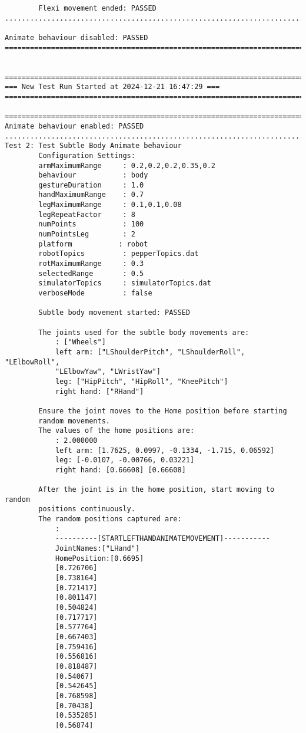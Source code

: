 \documentclass{CSSRforAfrica}
\begin{document}
\begin{verbatim}
        Flexi movement ended: PASSED
.......................................................................

Animate behaviour disabled: PASSED
=======================================================================


=======================================================================
=== New Test Run Started at 2024-12-21 16:47:29 ===
=======================================================================

=======================================================================
Animate behaviour enabled: PASSED
........................................................................
Test 2: Test Subtle Body Animate behaviour
        Configuration Settings:
        armMaximumRange     : 0.2,0.2,0.2,0.35,0.2
        behaviour           : body
        gestureDuration     : 1.0
        handMaximumRange    : 0.7
        legMaximumRange     : 0.1,0.1,0.08
        legRepeatFactor     : 8
        numPoints           : 100
        numPointsLeg        : 2
        platform           : robot
        robotTopics         : pepperTopics.dat
        rotMaximumRange     : 0.3
        selectedRange       : 0.5
        simulatorTopics     : simulatorTopics.dat
        verboseMode         : false

        Subtle body movement started: PASSED

        The joints used for the subtle body movements are:
            : ["Wheels"]
            left arm: ["LShoulderPitch", "LShoulderRoll", "LElbowRoll",
            "LElbowYaw", "LWristYaw"]
            leg: ["HipPitch", "HipRoll", "KneePitch"]
            right hand: ["RHand"]

        Ensure the joint moves to the Home position before starting
        random movements.
        The values of the home positions are:
            : 2.000000 
            left arm: [1.7625, 0.0997, -0.1334, -1.715, 0.06592] 
            leg: [-0.0107, -0.00766, 0.03221] 
            right hand: [0.66608] [0.66608] 

        After the joint is in the home position, start moving to random 
        positions continuously.
        The random positions captured are:
            : 
            ----------[STARTLEFTHANDANIMATEMOVEMENT]----------- 
            JointNames:["LHand"] 
            HomePosition:[0.6695] 
            [0.726706] 
            [0.738164] 
            [0.721417] 
            [0.801147] 
            [0.504824] 
            [0.717717] 
            [0.577764] 
            [0.667403] 
            [0.759416] 
            [0.556816] 
            [0.818487] 
            [0.54067] 
            [0.542645] 
            [0.768598] 
            [0.70438] 
            [0.535285] 
            [0.56874] 


\end{verbatim}
\end{document}
